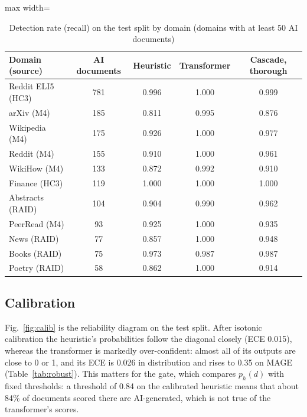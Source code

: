 \begin{table}[H]
\caption{Detection rate (recall) on the test split by domain (domains with at least 50 AI documents)}
\label{tab:bydomain}
\centering
\small
\begin{adjustbox}{max width=\textwidth}\begin{tabular}{|l|c|c|c|c|}
\hline
\textbf{Domain (source)} & \textbf{AI documents} & \textbf{Heuristic} & \textbf{Transformer} & \textbf{Cascade, thorough} \\ \hline
Reddit ELI5 (HC3) & 781 & 0.996 & 1.000 & 0.999 \\ \hline
arXiv (M4) & 185 & 0.811 & 0.995 & 0.876 \\ \hline
Wikipedia (M4) & 175 & 0.926 & 1.000 & 0.977 \\ \hline
Reddit (M4) & 155 & 0.910 & 1.000 & 0.961 \\ \hline
WikiHow (M4) & 133 & 0.872 & 0.992 & 0.910 \\ \hline
Finance (HC3) & 119 & 1.000 & 1.000 & 1.000 \\ \hline
Abstracts (RAID) & 104 & 0.904 & 0.990 & 0.962 \\ \hline
PeerRead (M4) & 93 & 0.925 & 1.000 & 0.935 \\ \hline
News (RAID) & 77 & 0.857 & 1.000 & 0.948 \\ \hline
Books (RAID) & 75 & 0.973 & 0.987 & 0.987 \\ \hline
Poetry (RAID) & 58 & 0.862 & 1.000 & 0.914 \\ \hline
\end{tabular}\end{adjustbox}
\end{table}

\subsection{Calibration}

Fig.~\ref{fig:calib} is the reliability diagram on the test split. After
isotonic calibration the heuristic's probabilities follow the diagonal closely
(ECE 0.015), whereas the transformer is markedly over-confident: almost all of
its outputs are close to 0 or 1, and its ECE is 0.026 in distribution and rises
to 0.35 on MAGE (Table~\ref{tab:robust}). This matters for the gate, which
compares $p_h(d)$ with fixed thresholds: a threshold of 0.84 on the calibrated
heuristic means that about 84\% of documents scored there are AI-generated,
which is not true of the transformer's scores.

